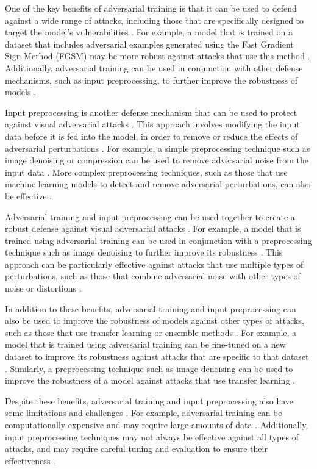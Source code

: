 \documentclass[11pt]{article}
\begin{document}
One of the key benefits of adversarial training is that it can be used to defend against a wide range of attacks, including those that are specifically designed to target the model's vulnerabilities \cite{ref69}. For example, a model that is trained on a dataset that includes adversarial examples generated using the Fast Gradient Sign Method (FGSM) may be more robust against attacks that use this method \cite{ref70}. Additionally, adversarial training can be used in conjunction with other defense mechanisms, such as input preprocessing, to further improve the robustness of models \cite{ref71}.

Input preprocessing is another defense mechanism that can be used to protect against visual adversarial attacks \cite{ref72}. This approach involves modifying the input data before it is fed into the model, in order to remove or reduce the effects of adversarial perturbations \cite{ref73}. For example, a simple preprocessing technique such as image denoising or compression can be used to remove adversarial noise from the input data \cite{ref74}. More complex preprocessing techniques, such as those that use machine learning models to detect and remove adversarial perturbations, can also be effective \cite{ref75}.

Adversarial training and input preprocessing can be used together to create a robust defense against visual adversarial attacks \cite{ref76}. For example, a model that is trained using adversarial training can be used in conjunction with a preprocessing technique such as image denoising to further improve its robustness \cite{ref77}. This approach can be particularly effective against attacks that use multiple types of perturbations, such as those that combine adversarial noise with other types of noise or distortions \cite{ref78}.

In addition to these benefits, adversarial training and input preprocessing can also be used to improve the robustness of models against other types of attacks, such as those that use transfer learning or ensemble methods \cite{ref79}. For example, a model that is trained using adversarial training can be fine-tuned on a new dataset to improve its robustness against attacks that are specific to that dataset \cite{ref80}. Similarly, a preprocessing technique such as image denoising can be used to improve the robustness of a model against attacks that use transfer learning \cite{ref81}.

Despite these benefits, adversarial training and input preprocessing also have some limitations and challenges \cite{ref46}. For example, adversarial training can be computationally expensive and may require large amounts of data \cite{ref82}. Additionally, input preprocessing techniques may not always be effective against all types of attacks, and may require careful tuning and evaluation to ensure their effectiveness \cite{ref83}.
\end{document}
